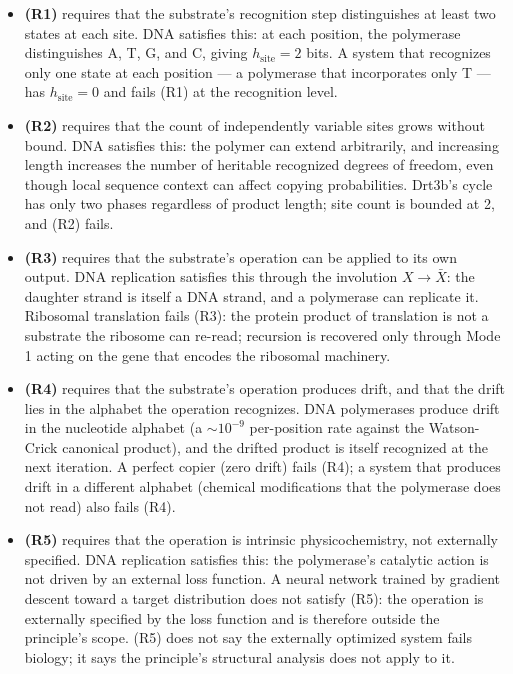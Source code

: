 \documentclass[aps,prx,reprint,amsmath,amssymb,floatfix,superscriptaddress,nofootinbib]{revtex4-2}
\theoremstyle{plain-thm}
\theoremstyle{definition-thm}
\begin{document}
\begin{itemize}
\item \textbf{(R1)} requires that the substrate's recognition step distinguishes at least two states at each site. DNA satisfies this: at each position, the polymerase distinguishes A, T, G, and C, giving $h_{\mathrm{site}} = 2$ bits. A system that recognizes only one state at each position --- a polymerase that incorporates only T --- has $h_{\mathrm{site}} = 0$ and fails (R1) at the recognition level.
\item \textbf{(R2)} requires that the count of independently variable sites grows without bound. DNA satisfies this: the polymer can extend arbitrarily, and increasing length increases the number of heritable recognized degrees of freedom, even though local sequence context can affect copying probabilities. Drt3b's cycle has only two phases regardless of product length; site count is bounded at 2, and (R2) fails.
\item \textbf{(R3)} requires that the substrate's operation can be applied to its own output. DNA replication satisfies this through the involution $X \to \bar{X}$: the daughter strand is itself a DNA strand, and a polymerase can replicate it. Ribosomal translation fails (R3): the protein product of translation is not a substrate the ribosome can re-read; recursion is recovered only through Mode 1 acting on the gene that encodes the ribosomal machinery.
\item \textbf{(R4)} requires that the substrate's operation produces drift, and that the drift lies in the alphabet the operation recognizes. DNA polymerases produce drift in the nucleotide alphabet (a $\sim 10^{-9}$ per-position rate against the Watson-Crick canonical product), and the drifted product is itself recognized at the next iteration. A perfect copier (zero drift) fails (R4); a system that produces drift in a different alphabet (chemical modifications that the polymerase does not read) also fails (R4).
\item \textbf{(R5)} requires that the operation is intrinsic physicochemistry, not externally specified. DNA replication satisfies this: the polymerase's catalytic action is not driven by an external loss function. A neural network trained by gradient descent toward a target distribution does not satisfy (R5): the operation is externally specified by the loss function and is therefore outside the principle's scope. (R5) does not say the externally optimized system fails biology; it says the principle's structural analysis does not apply to it.
\end{itemize}
\end{document}
